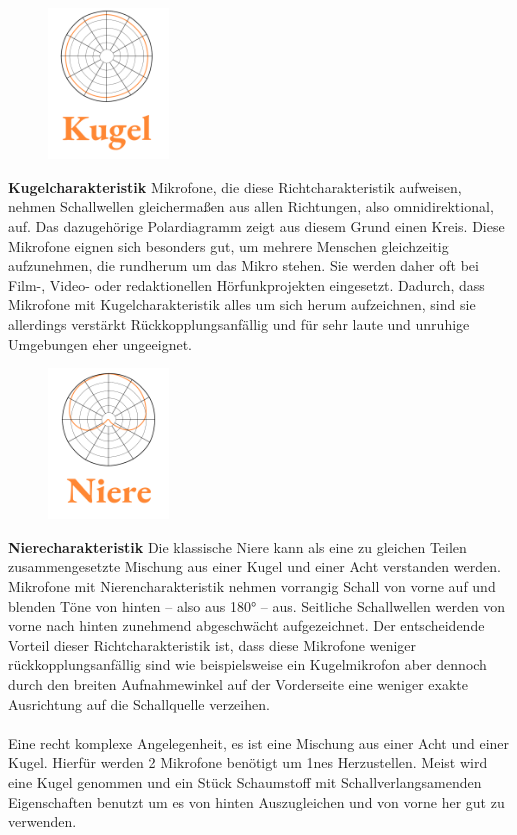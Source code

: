 \begin{figure}\vspace{-1cm}
\includegraphics[height=4cm]{Bilder/Medientechnik/Mikrocharakteristik_Kugel.png}
\end{figure}
 \textbf{Kugelcharakteristik} Mikrofone, die diese Richtcharakteristik aufweisen, nehmen Schallwellen gleichermaßen aus allen Richtungen, also omnidirektional, auf. Das dazugehörige Polardiagramm zeigt aus diesem Grund einen Kreis. Diese Mikrofone eignen sich besonders gut, um mehrere Menschen gleichzeitig aufzunehmen, die rundherum um das Mikro stehen. Sie werden daher oft bei Film-, Video- oder redaktionellen Hörfunkprojekten eingesetzt. Dadurch, dass Mikrofone mit Kugelcharakteristik alles um sich herum aufzeichnen, sind sie allerdings verstärkt Rückkopplungsanfällig und für sehr laute und unruhige Umgebungen eher ungeeignet.\\

\begin{figure}\vspace{-1cm}
\includegraphics[height=4cm]{Bilder/Medientechnik/Mikrocharakteristik_Niere.png}
\end{figure}
 \textbf{Nierecharakteristik} Die klassische Niere kann als eine zu gleichen Teilen zusammengesetzte Mischung aus einer Kugel und einer Acht verstanden werden. Mikrofone mit Nierencharakteristik nehmen vorrangig Schall von vorne auf und blenden Töne von hinten – also aus 180° – aus. Seitliche Schallwellen werden von vorne nach hinten zunehmend abgeschwächt aufgezeichnet. Der entscheidende Vorteil dieser Richtcharakteristik ist, dass diese Mikrofone weniger rückkopplungsanfällig sind wie beispielsweise ein Kugelmikrofon aber dennoch durch den breiten Aufnahmewinkel auf der Vorderseite eine weniger exakte Ausrichtung auf die Schallquelle verzeihen.\\~\\Eine recht komplexe Angelegenheit, es ist eine Mischung aus einer Acht und einer Kugel. Hierfür werden 2 Mikrofone benötigt um 1nes Herzustellen.
Meist wird eine Kugel genommen und ein Stück Schaumstoff mit Schallverlangsamenden Eigenschaften benutzt um es von hinten Auszugleichen und von vorne her gut zu verwenden.\\

